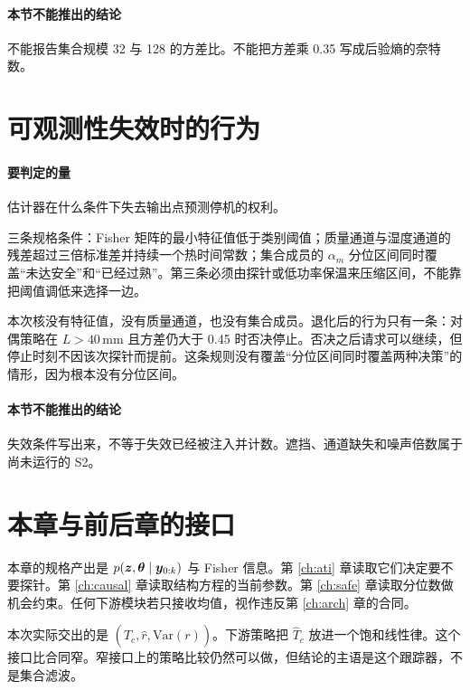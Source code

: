 \paragraph{本节不能推出的结论}
不能报告集合规模 32 与 128 的方差比。不能把方差乘 0.35 写成后验熵的奈特数。

\section{可观测性失效时的行为}

\paragraph{要判定的量}
估计器在什么条件下失去输出点预测停机的权利。

三条规格条件：Fisher 矩阵的最小特征值低于类别阈值；质量通道与湿度通道的残差超过三倍标准差并持续一个热时间常数；集合成员的 \(\alpha_m\) 分位区间同时覆盖“未达安全”和“已经过熟”。第三条必须由探针或低功率保温来压缩区间，不能靠把阈值调低来选择一边。

本次核没有特征值，没有质量通道，也没有集合成员。退化后的行为只有一条：对偶策略在 \(L>40\,\mathrm{mm}\) 且方差仍大于 0.45 时否决停止。否决之后请求可以继续，但停止时刻不因该次探针而提前。这条规则没有覆盖“分位区间同时覆盖两种决策”的情形，因为根本没有分位区间。

\paragraph{本节不能推出的结论}
失效条件写出来，不等于失效已经被注入并计数。遮挡、通道缺失和噪声倍数属于尚未运行的 S2。

\section{本章与前后章的接口}

本章的规格产出是 \(p(\bm{z},\bm{\theta}\mid\bm{y}_{0:k})\) 与 Fisher 信息。第 \ref{ch:ati} 章读取它们决定要不要探针。第 \ref{ch:causal} 章读取结构方程的当前参数。第 \ref{ch:safe} 章读取分位数做机会约束。任何下游模块若只接收均值，视作违反第 \ref{ch:arch} 章的合同。

本次实际交出的是 \((\hat T_c,\hat r,\mathrm{Var}(r))\)。下游策略把 \(\hat T_c\) 放进一个饱和线性律。这个接口比合同窄。窄接口上的策略比较仍然可以做，但结论的主语是这个跟踪器，不是集合滤波。
